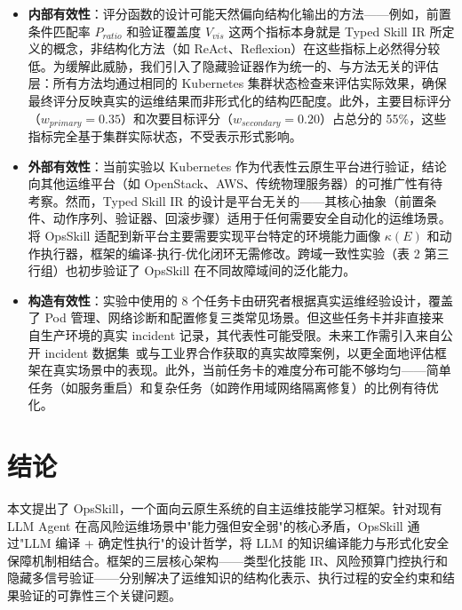 \documentclass[11pt,a4paper]{ctexart}
\begin{document}
\begin{itemize}[leftmargin=2em]
  \item \textbf{内部有效性}：评分函数的设计可能天然偏向结构化输出的方法——例如，前置条件匹配率 $P_{ratio}$ 和验证覆盖度 $V_{vis}$ 这两个指标本身就是 Typed Skill IR 所定义的概念，非结构化方法（如 ReAct、Reflexion）在这些指标上必然得分较低。为缓解此威胁，我们引入了隐藏验证器作为统一的、与方法无关的评估层：所有方法均通过相同的 Kubernetes 集群状态检查来评估实际效果，确保最终评分反映真实的运维结果而非形式化的结构匹配度。此外，主要目标评分（$w_{primary}=0.35$）和次要目标评分（$w_{secondary}=0.20$）占总分的 55\%，这些指标完全基于集群实际状态，不受表示形式影响。

  \item \textbf{外部有效性}：当前实验以 Kubernetes 作为代表性云原生平台进行验证，结论向其他运维平台（如 OpenStack、AWS、传统物理服务器）的可推广性有待考察。然而，Typed Skill IR 的设计是平台无关的——其核心抽象（前置条件、动作序列、验证器、回滚步骤）适用于任何需要安全自动化的运维场景。将 OpsSkill 适配到新平台主要需要实现平台特定的环境能力画像 $\kappa(E)$ 和动作执行器，框架的编译-执行-优化闭环无需修改。跨域一致性实验（表 2 第三行组）也初步验证了 OpsSkill 在不同故障域间的泛化能力。

  \item \textbf{构造有效性}：实验中使用的 8 个任务卡由研究者根据真实运维经验设计，覆盖了 Pod 管理、网络诊断和配置修复三类常见场景。但这些任务卡并非直接来自生产环境的真实 incident 记录，其代表性可能受限。未来工作需引入来自公开 incident 数据集~\cite{chen2020incidenttriage}或与工业界合作获取的真实故障案例，以更全面地评估框架在真实场景中的表现。此外，当前任务卡的难度分布可能不够均匀——简单任务（如服务重启）和复杂任务（如跨作用域网络隔离修复）的比例有待优化。
\end{itemize}


\section{结论}

本文提出了 OpsSkill，一个面向云原生系统的自主运维技能学习框架。针对现有 LLM Agent 在高风险运维场景中"能力强但安全弱"的核心矛盾，OpsSkill 通过"LLM 编译 + 确定性执行"的设计哲学，将 LLM 的知识编译能力与形式化安全保障机制相结合。框架的三层核心架构——类型化技能 IR、风险预算门控执行和隐藏多信号验证——分别解决了运维知识的结构化表示、执行过程的安全约束和结果验证的可靠性三个关键问题。
\end{document}
